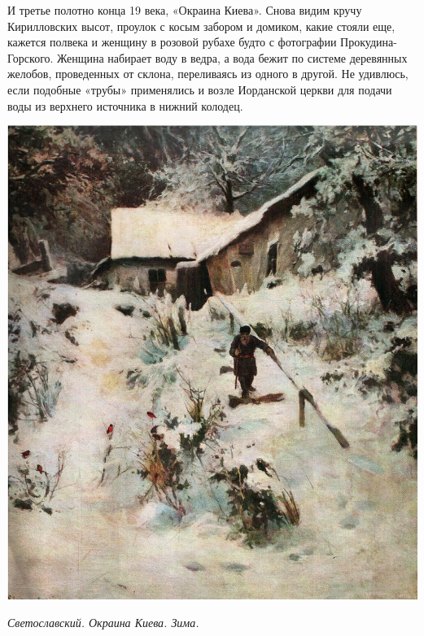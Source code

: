 И третье полотно конца 19 века, «Окраина Киева». Снова видим кручу Кирилловских высот, проулок с косым забором и домиком, какие стояли еще, кажется полвека и женщину в розовой рубахе будто с фотографии Прокудина-Горского. Женщина набирает воду в ведра, а вода бежит по системе деревянных желобов, проведенных от склона, переливаясь из одного в другой. Не удивлюсь, если подобные «трубы» применялись и возле Иорданской церкви для подачи воды из верхнего источника в нижний колодец.
\vspace*{\fill}
\begin{center}
\includegraphics[width=\linewidth]{chast-kirvys/svetosl/sveto-1890-okraina-kieva-zima.jpg}

\textit{Светославский. Окраина Киева. Зима.}
\end{center}
\vspace*{\fill}
\newpage

